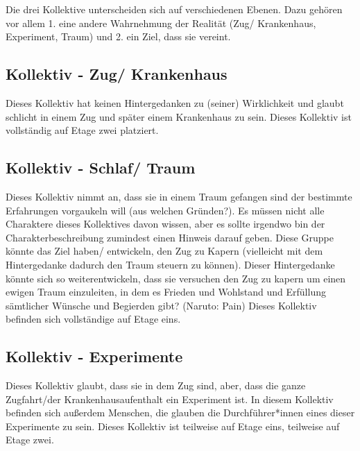 \documentclass[12pt, a4paper, openany]{report}
\begin{document}
Die drei Kollektive unterscheiden sich auf verschiedenen Ebenen. 
Dazu gehören vor allem 1. eine andere Wahrnehmung der Realität (Zug/ Krankenhaus, Experiment, Traum) und 2. ein Ziel, dass sie vereint.

\subsection{Kollektiv - Zug/ Krankenhaus}
Dieses Kollektiv hat keinen Hintergedanken zu (seiner) Wirklichkeit und glaubt schlicht in einem Zug und später einem Krankenhaus zu sein. 
Dieses Kollektiv ist vollständig auf Etage zwei platziert. 

\subsection{Kollektiv - Schlaf/ Traum}
Dieses Kollektiv nimmt an, dass sie in einem Traum gefangen sind der bestimmte Erfahrungen vorgaukeln will (aus welchen Gründen?).
Es müssen nicht alle Charaktere dieses Kollektives davon wissen, aber es sollte irgendwo bin der Charakterbeschreibung zumindest einen Hinweis darauf geben.
Diese Gruppe könnte das Ziel haben/ entwickeln, den Zug zu Kapern (vielleicht mit dem Hintergedanke dadurch den Traum steuern zu können).
Dieser Hintergedanke könnte sich so weiterentwickeln, dass sie versuchen den Zug zu kapern um einen ewigen Traum einzuleiten, in dem es Frieden und Wohlstand und Erfüllung sämtlicher Wünsche und Begierden gibt? (Naruto: Pain)
Dieses Kollektiv befinden sich vollständige auf Etage eins.

\subsection{Kollektiv - Experimente}
Dieses Kollektiv glaubt, dass sie in dem Zug sind, aber, dass die ganze Zugfahrt/der Krankenhausaufenthalt ein Experiment ist. 
In diesem Kollektiv befinden sich außerdem Menschen, die glauben die Durchführer*innen eines dieser Experimente zu sein.
Dieses Kollektiv ist teilweise auf Etage eins, teilweise auf Etage zwei.\\
\end{document}
